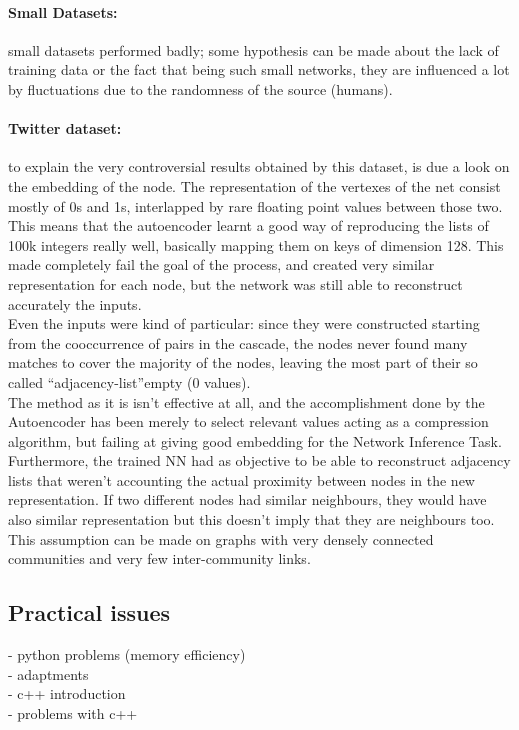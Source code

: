 \documentclass{article}
\begin{document}
			
				\paragraph{Small Datasets:} small datasets performed badly; some hypothesis can be made about the lack of training data or the fact that being such small networks, they are influenced a lot by fluctuations due to the randomness of the source (humans).
				\paragraph{Twitter dataset:} to explain the very controversial results obtained by this dataset, is due a look on the embedding of the node. The representation of the vertexes of the net consist mostly of 0s and 1s, interlapped by rare floating point values between those two. This means that the autoencoder learnt a good way of reproducing the lists of 100k integers really well, basically mapping them on keys of dimension 128. This made completely fail the goal of the process, and created very similar representation for each node, but the network was still able to reconstruct accurately the inputs.\\
				Even the inputs were kind of particular: since they were constructed starting from the cooccurrence of pairs in the cascade, the nodes never found many matches to cover the majority of the nodes, leaving the most part of their so called \textquotedblleft adjacency-list\textquotedblright empty (0 values). \bigskip \\
				The method as it is isn't effective at all, and the accomplishment done by the Autoencoder has been merely to select relevant values acting as a compression algorithm, but failing at giving good embedding for the Network Inference Task. Furthermore, the trained NN had as objective to be able to reconstruct adjacency lists that weren't accounting the actual proximity between nodes in the new representation. If two different nodes had similar neighbours, they would have also similar representation but this doesn't imply that they are neighbours too. This assumption can be made on graphs with very densely connected communities and very few inter-community links.
				
				\newpage
			\subsection{Practical issues}
			- python problems (memory efficiency)\\
			- adaptments\\
			- c++ introduction\\
			- problems with c++\\
			
\end{document}
